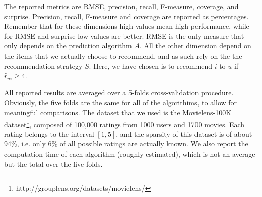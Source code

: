The reported metrics are RMSE, precision, recall, F-measure, coverage, and
surprise. Precision, recall, F-measure and coverage  are reported as
percentages. Remember that for these dimensions high values mean high
performance, while for RMSE and surprise low values are better.  RMSE is the
only measure that only depends on the prediction algorithm $A$. All the other
dimension depend on the items that we actually choose to recommend, and as such
rely on the the recommendation strategy $S$. Here, we have chosen is to
recommend $i$ to $u$ if $\hat{r}_{ui} \geq 4$.

All reported results are averaged over a 5-folds cross-validation
procedure. Obviously, the five folds are the same for all of the algorithims,
to allow for meaningful comparisons.  The dataset that we used is the
Movielens-100K dataset\footnote{http://grouplens.org/datasets/movielens/},
composed of 100,000 ratings from 1000 users and 1700 movies. Each rating
belongs to the interval $[1, 5]$, and the sparsity of this dataset is of about
94\%, i.e. only 6\% of all possible ratings are actually known. We also
report the computation time of each algorithm (roughly estimated), which is not
an average but the total over the five folds.


